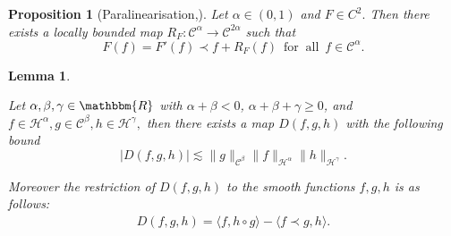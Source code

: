 \documentclass[11pt, oneside]{article}   	%
\newcommand{\tmop}[1]{\ensuremath{\operatorname{#1}}}
\newtheorem{lemma}[theorem]{Lemma}
\newtheorem{proposition}[theorem]{Proposition}
\newcommand{\CC}{\mathscr{C}}
\newcommand{\ssp}{\mathscr{H}}
\begin{document}
\begin{proposition}[Paralinearisation,\cite{gubinelli2017kpz}]
	\label{lem:paralin} Let $\alpha \in (0, 1) $ and $F \in C^2 .$ Then there
	exists a locally bounded map $R_F : \CC^{\alpha} \rightarrow
	\CC^{2 \alpha}$ such that
	\[ F (f) = F' (f) \prec f + R_F (f) \ \tmop{for}   \tmop{all} \  f \in
	\CC^{\alpha} . \]
\end{proposition}

\begin{lemma}\label{lem:circadj}
	
		Let $\alpha, \beta, \gamma \in \mathbbm{R}$ with $\alpha + \beta <0$, $\alpha + \beta + \gamma \geq
	0$, and $f \in \ssp^{\alpha}, g \in \CC^{\beta}, h \in \ssp^{\gamma},$
	then there exists a map $D (f, g, h)$ with the following bound
	\begin{equation} \label{equ:commLemma}
	| D (f, g, h) | \lesssim \| g \|_{\CC^{\beta}} \| f
	\|_{\ssp^{\alpha}} \| h \|_{\ssp^{\gamma}} . \end{equation}
	
	
	Moreover the restriction of $D (f, g, h)$  to the smooth functions $f, g, h$ is as follows:
	\begin{align*}
	D (f, g, h) = \langle f, h \circ g \rangle - \langle f \prec g, h
	\rangle.
	\end{align*}
	
	

\end{lemma}
\end{document}
